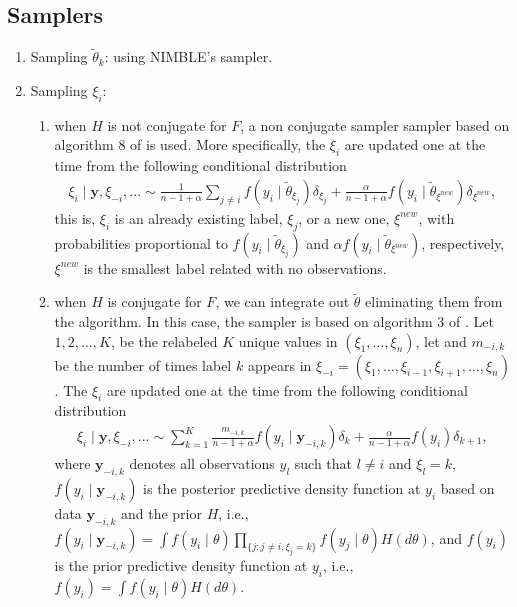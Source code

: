 \documentclass[12pt]{article}
\newcommand{\by}{\boldsymbol{y}}
\begin{document}
\subsection{Samplers}
\begin{enumerate}
\item Sampling $\tilde{\theta}_k$: using NIMBLE's sampler.
\item Sampling $\xi_i$:
\begin{enumerate}
\item when $H$ is not conjugate for $F$, a non conjugate sampler sampler based on algorithm 8 of \cite{neal;2000} is used.  More specifically, the $\xi_i$ are updated one at the time  from the following conditional distribution
\begin{align*}
\xi_i\mid \boldsymbol{y}, \xi_{-i},... \sim \frac{1}{n-1+\alpha}\sum_{j \neq i}f(y_i\mid \tilde{\theta}_{\xi_j})\delta_{\xi_j} +\frac{\alpha}{n-1+\alpha}f(y_i\mid \tilde{\theta}_{\xi^{new}})\delta_{\xi^{new}},
\end{align*}
this is, $\xi_i$ is an already existing label, $\xi_j$,  or a new one, $\xi^{new}$, with probabilities proportional to $f(y_i\mid \tilde{\theta}_{\xi_j})$ and $\alpha f(y_i\mid \tilde{\theta}_{\xi^{new}})$, respectively,   $\xi^{new}$ is the smallest label related with no observations. 
\item when $H$ is conjugate for $F$, we can integrate out $\tilde{\theta}$ eliminating them from the algorithm. In this case, the sampler is  based on algorithm 3 of \cite{neal;2000}. Let $1, 2, \ldots, K$, be the relabeled  $K$ unique values in $(\xi_1, \ldots, \xi_n)$, let and $m_{-i,k}$ be the number of times label $k$ appears in $\xi_{-i}=(\xi_1, \ldots, \xi_{i-1}, \xi_{i+1}, \ldots, \xi_n)$.  The $\xi_i$ are updated one at the time  from the following conditional distribution
\begin{align*}
\xi_i\mid \boldsymbol{y}, \xi_{-i},... \sim \sum_{k =1 }^K\frac{m_{-i,k}}{n-1+\alpha}f(y_i\mid \by_{-i,k})\delta_{k} +\frac{\alpha}{n-1+\alpha}f(y_i)\delta_{k+1},
\end{align*}
where $\by_{-i, k}$ denotes all observations $y_l$ such that $l\neq i$ and $\xi_l=k$,  $f(y_i\mid \by_{-i, k})$ is the posterior predictive density function  at $y_i$ based on data $\by_{-i, k}$ and the prior $H$, i.e., $f(y_i\mid \by_{-i, k})=\int f(y_i\mid \theta)\prod_{\{j : j\neq i, \xi_j=k\}}f(y_j\mid \theta)H(d\theta) $,  and $f(y_i)$ is the prior predictive density function at $y_i$, i.e., $f(y_i)=\int f(y_i\mid \theta)H(d\theta)$. 


\end{enumerate}
\end{enumerate}
\end{document}
